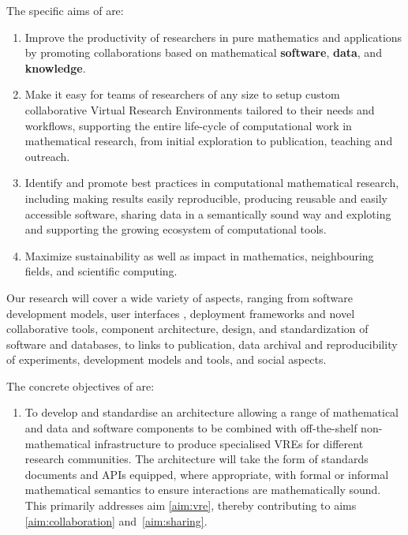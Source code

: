 \documentclass[noworkareas,deliverables,gitinfo,compactht]{euproposal}
\begin{document}
\begin{proposal}
The specific aims of \TheProject are:


\begin{enumerate}
\item \label{aim:collaboration} Improve the productivity of
  researchers in pure mathematics and applications by promoting
  collaborations based on mathematical \textbf{software},
  \textbf{data}, and \textbf{knowledge}.
\item \label{aim:vre} Make it easy for teams of
  researchers of any size to setup custom collaborative Virtual Research
  Environments tailored to their needs and workflows, supporting the
  entire life-cycle of computational work in mathematical research,
  from initial exploration to publication, teaching and outreach.
\item \label{aim:sharing} Identify and promote best practices in
  computational mathematical research, including making results easily
  reproducible, producing reusable and easily accessible
  software, sharing data in a semantically sound way and exploting and
  supporting the growing ecosystem of computational tools.
\item \label{aim:impact} Maximize sustainability as well as impact in
  mathematics, neighbouring fields, and scientific computing.

\end{enumerate}



Our research will cover a wide variety of aspects, ranging from
software development models, user interfaces , deployment frameworks and novel collaborative tools,
component architecture, design, and standardization of software
 and databases, to links to publication, data archival
and reproducibility of experiments, development models and tools, and
social aspects.


The concrete objectives of \TheProject are:
\begin{enumerate}
\item\label{objective:framework} To develop and standardise
  an architecture allowing a range of mathematical and
  data and software components to be combined 
  with off-the-shelf non-mathematical infrastructure to produce
  specialised VREs for different research communities. The
  architecture will take the form of standards documents and APIs
  equipped, where appropriate, with formal or informal mathematical
  semantics to ensure interactions are mathematically sound. This primarily
  addresses aim \ref{aim:vre}, thereby contributing to aims
  \ref{aim:collaboration} and~\ref{aim:sharing}. 


\end{enumerate}
\end{proposal}
\end{document}
